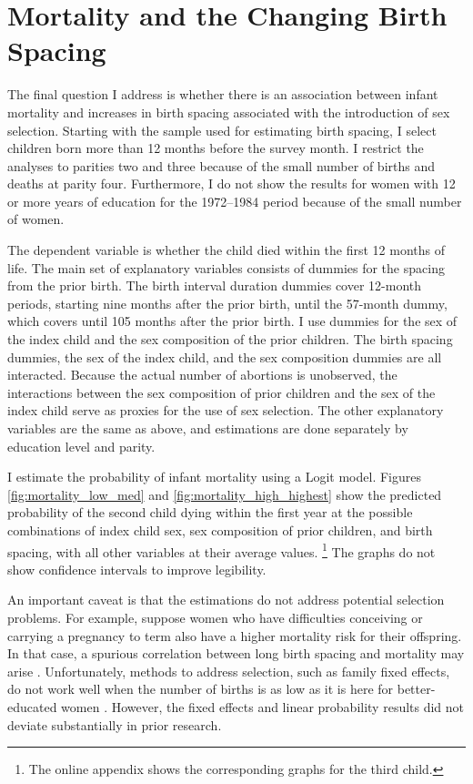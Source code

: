 \documentclass[12pt,letterpaper]{article}
\begin{document}
\section{Mortality and the Changing Birth Spacing\label{sec:mortality}}

The final question I address is whether there is an association between infant mortality 
and increases in birth spacing associated with the introduction of sex selection. 
Starting with the sample used for estimating birth spacing, I select children born more 
than 12 months before the survey month. 
I restrict the analyses to parities two and three because of the small number of births 
and deaths at parity four. 
Furthermore, I do not show the results for women with 12 or more years of education 
for the 1972--1984 period because of the small number of women.

The dependent variable is whether the child died within the first 12 months of life.
The main set of explanatory variables consists of dummies for the spacing from
the prior birth.
The birth interval duration dummies cover 12-month periods, starting nine months after the 
prior birth, until the 57-month dummy, which covers until 105 months after the prior birth.
I use dummies for the sex of the index child and the sex composition 
of the prior children.
The birth spacing dummies, the sex of the index child, and the sex composition dummies
are all interacted.
Because the actual number of abortions is unobserved, the interactions between
the sex composition of prior children and the sex of the index child serve
as proxies for the use of sex selection.
The other explanatory variables are the same as above, and estimations
are done separately by education level and parity.

I estimate the probability of infant mortality using a Logit model.
Figures \ref{fig:mortality_low_med} and \ref{fig:mortality_high_highest} show 
the predicted probability of the second child dying within the first year at the 
possible combinations of index child sex, sex composition of prior children, and 
birth spacing, with all other variables at their average values.%
\footnote{
The online appendix shows the corresponding graphs for the third child.
}
The graphs do not show confidence intervals to improve legibility.

An important caveat is that the estimations do not address potential selection problems.
For example, suppose women who have diﬀiculties conceiving or carrying a pregnancy to 
term also have a higher mortality risk for their offspring. 
In that case, a spurious correlation between long birth spacing and mortality may arise 
\citep{Kozuki2013}. 
Unfortunately, methods to address selection, such as family fixed effects, do not work 
well when the number of births is as low as it is here for better-educated women 
\citep{Kozuki2013,Molitoris2019}.
However, the fixed effects and linear probability results did not 
deviate substantially in prior research.
\end{document}

